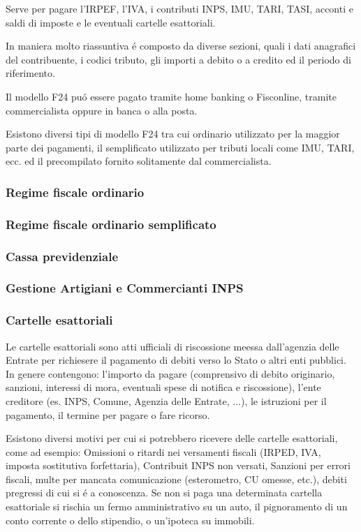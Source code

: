\documentclass{article}
\begin{document}
Serve per pagare l'IRPEF, l'IVA, i contributi INPS, IMU, TARI, TASI, acconti e saldi di imposte e le eventuali cartelle esattoriali.

In maniera molto riassuntiva \'e composto da diverse sezioni, quali i dati anagrafici del contribuente, i codici tributo, gli importi a debito o a credito ed il periodo di riferimento.

Il modello F24 pu\'o essere pagato tramite home banking o Fisconline, tramite commercialista oppure in banca o alla posta.

Esistono diversi tipi di modello F24 tra cui ordinario utilizzato per la maggior parte dei pagamenti, il semplificato utilizzato per tributi locali come IMU, TARI, ecc. ed il precompilato fornito solitamente dal commercialista.

\subsubsection{Regime fiscale ordinario}
\subsubsection{Regime fiscale ordinario semplificato}

\subsubsection{Cassa previdenziale}
\subsubsection{Gestione Artigiani e Commercianti INPS}

\subsubsection{Cartelle esattoriali}
Le cartelle esattoriali sono atti ufficiali di riscossione meessa dall'agenzia delle Entrate per richiesere il pagamento di debiti verso lo Stato o altri enti pubblici. In genere contengono: l'importo da pagare (comprensivo di debito originario, sanzioni, interessi di mora, eventuali spese di notifica e riscossione), l'ente creditore (es. INPS, Comune, Agenzia delle Entrate, ...), le istruzioni per il pagamento, il termine per pagare o fare ricorso. 

Esistono diversi motivi per cui si potrebbero ricevere delle cartelle esattoriali, come ad esempio: Omissioni o ritardi nei versamenti fiscali (IRPED, IVA, imposta sostitutiva forfettaria), Contribuit INPS non versati, Sanzioni per errori fiscali, multe per mancata comunicazione (esterometro, CU omesse, etc.), debiti pregressi di cui si \'e a conoscenza. Se non si paga una determinata cartella esattoriale si rischia un fermo amministrativo su un auto, il pignoramento di un conto corrente o dello stipendio, o un'ipoteca su immobili. 
\end{document}
